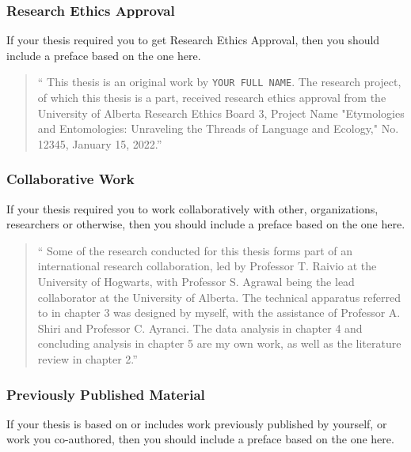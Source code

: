 
			\subsubsection{Research Ethics Approval}
				If your thesis required you to get Research Ethics Approval, then you should include a preface based on the one here.

				\begin{quote}
					\enquote{
						This thesis is an original work by \texttt{YOUR FULL NAME}. 
						The research project, of which this thesis is a part, received research ethics approval from the University of Alberta Research Ethics Board 3, Project Name "Etymologies and Entomologies: Unraveling the Threads of Language and Ecology," No. 12345, January 15, 2022.}
				\end{quote}

			\subsubsection{Collaborative Work}
				If your thesis required you to work collaboratively with other, organizations, researchers or otherwise, then you should include a preface based on the one here.

				\begin{quote}
					\enquote{
						Some of the research conducted for this thesis forms part of an international research collaboration, led by Professor T. Raivio at the University of Hogwarts, with Professor S. Agrawal being the lead collaborator at the University of Alberta. 
						The technical apparatus referred to in chapter 3 was designed by myself, with the assistance of Professor A. Shiri and Professor C. Ayranci. 
						The data analysis in chapter 4 and concluding analysis in chapter 5 are my own work, as well as the literature review in chapter 2.}
				\end{quote}

			\subsubsection{Previously Published Material}
				If your thesis is based on or includes work previously published by yourself, or work you co-authored, then you should include a preface based on the one here.

